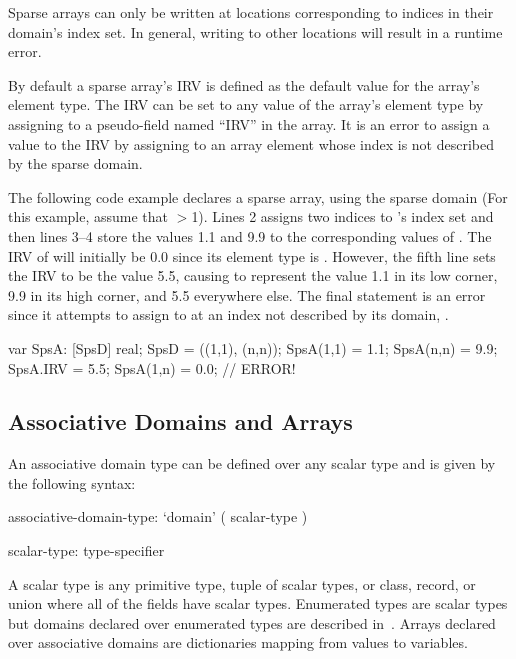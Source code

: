 Sparse arrays can only be written at locations corresponding to
indices in their domain's index set.  In general, writing to other
locations will result in a runtime error.

By default a sparse array's IRV is defined as the default value for
the array's element type.  The IRV can be set to any value of the
array's element type by assigning to a pseudo-field named ``IRV'' in
the array.  It is an error to assign a value to the IRV by assigning
to an array element whose index is not described by the sparse domain.

\begin{example}
The following code example declares a sparse array,  using
the sparse domain  (For this example, assume that
$>$1).  Lines 2 assigns two indices to 's index set
and then lines 3--4 store the values 1.1 and 9.9 to the corresponding
values of .  The IRV of  will initially be 0.0
since its element type is .  However, the fifth line sets
the IRV to be the value 5.5, causing  to represent the
value 1.1 in its low corner, 9.9 in its high corner, and 5.5
everywhere else.  The final statement is an error since it attempts to
assign to  at an index not described by its domain,
.

\begin{chapel}
var SpsA: [SpsD] real;
SpsD = ((1,1), (n,n));
SpsA(1,1) = 1.1;
SpsA(n,n) = 9.9;
SpsA.IRV = 5.5;
SpsA(1,n) = 0.0;  // ERROR!
\end{chapel}
\end{example}



\subsection{Associative Domains and Arrays}
\label{Associative_Domains_and_Arrays}

An associative domain type can be defined over any scalar type and is
given by the following syntax:
\begin{syntax}
associative-domain-type:
  `domain' ( scalar-type )

scalar-type:
  type-specifier
\end{syntax}
A scalar type is any primitive type, tuple of scalar types, or class,
record, or union where all of the fields have scalar types.
Enumerated types are scalar types but domains declared over enumerated
types are described in~.  Arrays
declared over associative domains are dictionaries mapping from values
to variables.

